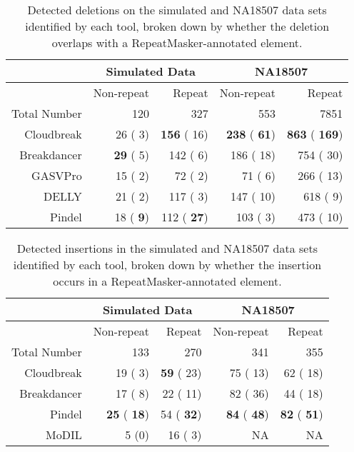 \documentclass[11pt]{article}
\begin{document}
\begin{table}[b]
\begin{center}
\begin{tabular}{rrr|rr}
 & \multicolumn{2}{c}{Simulated Data} & \multicolumn{2}{c}{NA18507} \\
\hline
 &  Non-repeat & Repeat  &  Non-repeat & Repeat \\ 
 Total Number & 120 & 327 & 553 & 7851 \\ 
  \hline
  Cloudbreak  &   26 (   3) & \textbf{ 156} (  16) & \textbf{ 238} (\textbf{  61}) & \textbf{ 863} (\textbf{ 169}) \\ 
  Breakdancer & \textbf{  29} (   5) &  142 (   6) &  186 (  18) &  754 (  30) \\
  GASVPro     &   15 (   2) &   72 (   2) &   71 (   6) &  266 (  13) \\
  DELLY       &   21 (   2) &  117 (   3) &  147 (  10) &  618 (   9) \\
  Pindel      &   18 (\textbf{   9}) &  112 (\textbf{  27}) &  103 (   3) &  473 (  10) \\ 
   \hline
\end{tabular}
\end{center}
\caption{Detected deletions on the simulated and NA18507 data sets identified by each tool, broken down by whether the deletion overlaps with a RepeatMasker-annotated element.}
\label{deletionRepmaskpreds}
\end{table}

\begin{table}[b]
\begin{center}
\begin{tabular}{rrr|rr}
 & \multicolumn{2}{c}{Simulated Data} & \multicolumn{2}{c}{NA18507} \\
\hline
 &  Non-repeat & Repeat  &  Non-repeat & Repeat \\ 
 Total Number & 133 & 270 & 341 & 355 \\ 
  \hline
  Cloudbreak  &   19 (   3) & \textbf{  59} (  23) &   75 (  13) &   62 (  18) \\ 
  Breakdancer &   17 (   8) &   22 (  11) &   82 (  36) &   44 (  18) \\
  Pindel      & \textbf{  25} (\textbf{  18}) &   54 (\textbf{  32}) & \textbf{  84} (\textbf{  48}) & \textbf{  82} (\textbf{  51}) \\ 
  MoDIL      &    5 (0) &   16 (   3) & NA & NA \\ 
   \hline
\end{tabular}
\end{center}
\caption{Detected insertions in the simulated and NA18507 data sets identified by each tool, broken down by whether the insertion occurs in a RepeatMasker-annotated element.}
\label{insertionRepmaskpreds}
\end{table}
\end{document}
